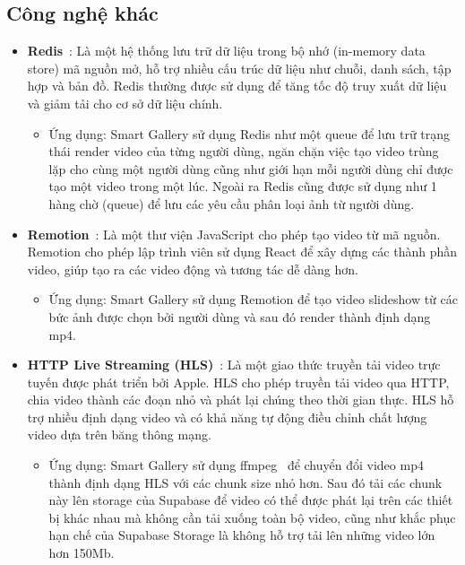 \subsection{Công nghệ khác}
\begin{itemize}
    \item \textbf{Redis}~\cite{redisdoc}: Là một hệ thống lưu trữ dữ liệu trong bộ nhớ (in-memory data store) mã nguồn mở, hỗ trợ nhiều cấu trúc dữ liệu như chuỗi, danh sách, tập hợp và bản đồ. Redis thường được sử dụng để tăng tốc độ truy xuất dữ liệu và giảm tải cho cơ sở dữ liệu chính.
    \begin{itemize}
        \item Ứng dụng: Smart Gallery sử dụng Redis như một queue để lưu trữ trạng thái render video của từng người dùng, ngăn chặn việc tạo video trùng lặp cho cùng một người dùng cũng như giới hạn mỗi người dùng chỉ được tạo một video trong một lúc. Ngoài ra Redis cũng được sử dụng như 1 hàng chờ (queue) để lưu các yêu cầu phân loại ảnh từ người dùng. 
    \end{itemize}
    
    \item \textbf{Remotion}~\cite{remotion}: Là một thư viện JavaScript cho phép tạo video từ mã nguồn. Remotion cho phép lập trình viên sử dụng React để xây dựng các thành phần video, giúp tạo ra các video động và tương tác dễ dàng hơn.
    \begin{itemize}
        \item Ứng dụng: Smart Gallery sử dụng Remotion để tạo video slideshow từ các bức ảnh được chọn bởi người dùng và sau đó render thành định dạng mp4.
    \end{itemize}
    
    \item \textbf{HTTP Live Streaming (HLS)}~\cite{hls}: Là một giao thức truyền tải video trực tuyến được phát triển bởi Apple. HLS cho phép truyền tải video qua HTTP, chia video thành các đoạn nhỏ và phát lại chúng theo thời gian thực. HLS hỗ trợ nhiều định dạng video và có khả năng tự động điều chỉnh chất lượng video dựa trên băng thông mạng.
    \begin{itemize}
        \item Ứng dụng: Smart Gallery sử dụng ffmpeg~\cite{ffmpeg} để chuyển đổi video mp4 thành định dạng HLS với các chunk size nhỏ hơn. Sau đó tải các chunk này lên storage của Supabase để video có thể được phát lại trên các thiết bị khác nhau mà không cần tải xuống toàn bộ video, cũng như khắc phục hạn chế của Supabase Storage là không hỗ trợ tải lên những video lớn hơn 150Mb.
    \end{itemize}
\end{itemize}